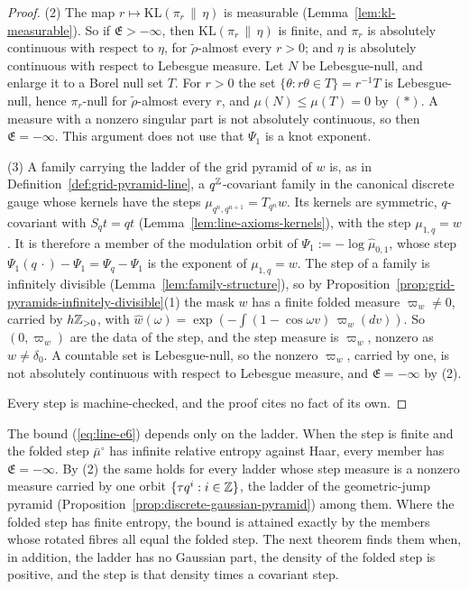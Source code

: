 \begin{proof}
(2) The map $r \mapsto \mathrm{KL}(\pi_r \,\|\, \eta)$ is measurable
(Lemma~\ref{lem:kl-measurable}). So if $\mathfrak{E} > -\infty$, then
$\mathrm{KL}(\pi_r \,\|\, \eta)$ is finite, and $\pi_r$ is absolutely continuous with respect to $\eta$, for $\tilde\rho$-almost every $r > 0$; and $\eta$ is absolutely continuous with respect to
Lebesgue measure. Let $N$ be Lebesgue-null, and enlarge it to a Borel null set $T$. For $r > 0$
the set $\{\theta : r\theta \in T\} = r^{-1}T$ is Lebesgue-null, hence $\pi_r$-null for
$\tilde\rho$-almost every $r$, and $\mu(N) \le \mu(T) = 0$ by $(*)$. A measure with a nonzero
singular part is not absolutely continuous, so then $\mathfrak{E} = -\infty$. This argument does not
use that $\Psi_1$ is a knot exponent.

(3) A family carrying the ladder of the grid pyramid of $w$ is, as in
Definition~\ref{def:grid-pyramid-line}, a $q^{\mathbb{Z}}$-covariant family in the canonical discrete
gauge whose kernels have the steps $\mu_{q^n,q^{n+1}} = T_{q^n}w$. Its kernels are symmetric,
$q$-covariant with $S_qt = qt$ (Lemma~\ref{lem:line-axioms-kernels}), with the step
$\mu_{1,q} = w$. It is
therefore a member of the modulation orbit of $\Psi_1 := -\log\widehat\mu_{0,1}$, whose step
$\Psi_1(q\,\cdot) - \Psi_1 = \Psi_q - \Psi_1$ is the exponent of $\mu_{1,q} = w$. The step of a
family is infinitely divisible (Lemma~\ref{lem:family-structure}), so by
Proposition~\ref{prop:grid-pyramids-infinitely-divisible}(1) the mask $w$ has a finite folded
\Levy{} measure $\varpi_w \ne 0$, carried by $h\mathbb{Z}_{>0}$, with
$\widehat w(\omega) = \exp(-\int(1 - \cos\omega v)\,\varpi_w(dv))$. So $(0, \varpi_w)$ are the data
of the step, and the step measure is $\varpi_w$, nonzero as $w \ne \delta_0$. A countable set is
Lebesgue-null, so the nonzero $\varpi_w$, carried by one, is not absolutely continuous with respect
to Lebesgue measure, and $\mathfrak{E} = -\infty$ by (2).

Every step is machine-checked, and the proof cites no fact of its own.
\end{proof}

The bound (\ref{eq:line-e6}) depends only on the ladder. When the step is finite and the folded step
$\bar\mu^\circ$ has infinite relative entropy against Haar, every member has $\mathfrak{E} = -\infty$.
By (2) the same holds for every ladder whose step measure is a nonzero measure carried by one orbit
$\{\tau q^i : i \in \mathbb{Z}\}$, the ladder of the geometric-jump pyramid
(Proposition~\ref{prop:discrete-gaussian-pyramid}) among them. Where the folded step has finite
entropy, the bound is attained exactly by the members whose rotated fibres all equal the folded
step. The next theorem finds them when, in addition, the ladder has no Gaussian part, the density of
the folded step is positive, and the step is that density times a covariant step.

